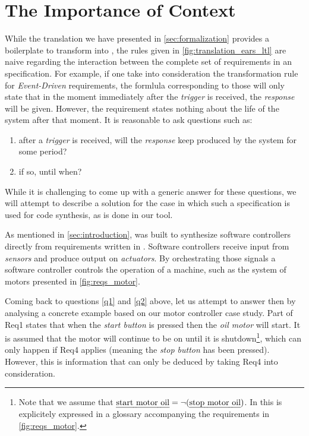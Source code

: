 \section{The Importance of Context}
\label{sec:context}

While the translation we have presented in \sect\ref{sec:formalization}
provides a boilerplate to transform \ears into \ltl, the rules given in
\tab\ref{fig:translation_ears_ltl} are naive regarding the interaction between
the complete set of requirements in an \ears specification. For example, if one
take into consideration the transformation rule for \emph{Event-Driven} requirements, the \ltl formlula
corresponding to those will only state that in the moment immediately after the
\emph{trigger} is received, the \emph{response} will be given. However,
the requirement states nothing about the life of the system after
that moment. It is reasonable to ask questions such as:

\begin{enumerate}
  \item after a \emph{trigger} is received, will the \emph{response}
  keep produced by the system for some period?
  \label{q1}
  \item if so, until when?
  \label{q2}
\end{enumerate}

While it is challenging to come up with a generic answer for these questions,
we will attempt to describe a solution for the case in which such a specification is
used for code synthesis, as is done in our \earsctrl tool.

As mentioned in \sect\ref{sec:introduction}, \earsctrl was built to synthesize
software controllers directly from requirements written in \ears. Software
controllers receive input from \emph{sensors} and produce output on
\emph{actuators}. By orchestrating those signals a software controller
controls the operation of a machine, such as the system of motors presented in
\fig\ref{fig:reqs_motor}.

Coming back to questions \ref{q1} and \ref{q2} above, let us attempt to answer
then by analysing a concrete example based on our motor controller case study.
Part of \textsf{Req1} states that when the \emph{start button} is pressed then
the \emph{oil motor} will start. It is assumed that the motor will continue to
be on until it is shutdown\footnote{Note that we assume that $\text{\emph{start
motor oil}} = \neg(\text{\emph{stop motor oil}})$. In \earsctrl this is
explicitely expressed in a glossary accompanying the requirements in
\fig\ref{fig:reqs_motor}.}, which can only happen if \textsf{Req4} applies
(meaning the \emph{stop button} has been pressed).
However, this is information that can only be deduced by taking \textsf{Req4}
into consideration.

